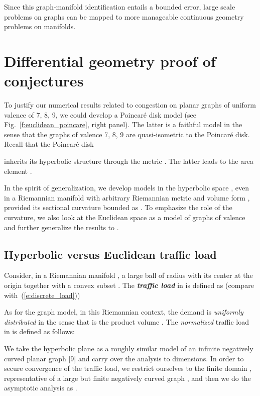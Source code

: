 \documentclass{article}
\begin{document}
Since this graph-manifold identification entails a bounded error, large scale problems on graphs can be mapped to more manageable continuous geometry problems on manifolds.

\noindent 

\noindent 
\section{Differential geometry proof of conjectures} 
\label{s:dif_geom}

To justify our numerical results related to congestion on planar graphs of uniform valence of 7, 8, 9, 
we could develop a Poincar\'e disk model (see Fig.~\ref{f:euclidean_poincare}, right panel). 
The latter is a faithful model 
in the sense that the graphs of valence 7, 8, 9 are quasi-isometric to the Poincar\'e disk. 
Recall that the Poincar\'e disk 
 
inherits its hyperbolic structure through the metric 
. 
The latter leads to the area element .

In the spirit of generalization, we develop models in the hyperbolic space , 
even in a Riemannian manifold  with arbitrary Riemannian metric  and volume form ,  
provided its sectional curvature bounded as . 
To emphasize the role of the curvature, we also look at the Euclidean space  
as a model of graphs of valence  and further generalize the results to .  

\noindent 
\subsection{Hyperbolic versus Euclidean traffic load}
\label{s:euclidean_vs_hyperbolic}

Consider, in a Riemannian manifold , a large ball  of radius  with its center at the origin together with a convex subset . The \textit{\textbf{traffic load}} in  is defined as (compare with~(\ref{e:discrete_load}))
 
As for the graph model, in this Riemannian context, 
the demand is {\it uniformly distributed} in the sense that  is the 
product volume . 
The \textit{normalized} traffic load in  is defined as follows:







We take the hyperbolic plane  as a roughly similar model 
of an infinite negatively curved planar graph [9] and carry over the analysis to  dimensions. 
In order to secure convergence of the traffic load, 
we restrict ourselves to the finite domain ,  
representative of a large but finite negatively curved graph ,  
and then we do the asymptotic analysis as . 
\end{document}
